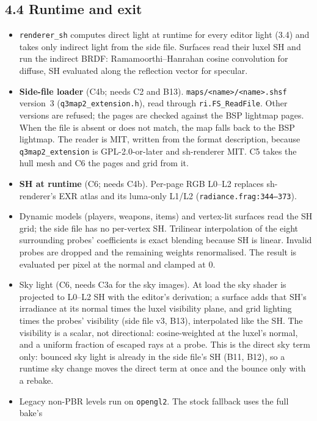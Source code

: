 \documentclass[11pt,a4paper]{article}
\begin{document}
\subsection{4.4 Runtime and exit}
\begin{itemize}
\item \texttt{renderer\_sh} computes direct light at runtime for every editor light (3.4) and takes
  only indirect light from the side file. Surfaces read their luxel SH and run the indirect BRDF:
  Ramamoorthi--Hanrahan cosine convolution for diffuse, SH evaluated along the reflection vector for
  specular.
\item \textbf{Side-file loader} (C4b; needs C2 and B13). \texttt{maps/<name>/<name>.shsf} version~3
  (\texttt{q3map2\_extension.h}), read through \texttt{ri.FS\_ReadFile}. Other versions are
  refused; the pages are checked against the BSP lightmap pages. When the file is absent or does not
  match, the map falls back to the BSP lightmap. The reader is MIT, written from the format
  description, because \texttt{q3map2\_extension} is GPL-2.0-or-later and sh-renderer MIT. C5 takes
  the hull mesh and C6 the pages and grid from it.
\item \textbf{SH at runtime} (C6; needs C4b). Per-page RGB L0--L2 replaces sh-renderer's EXR atlas
  and its luma-only L1/L2 (\texttt{radiance.frag:344--373}).
\item Dynamic models (players, weapons, items) and vertex-lit surfaces read the SH grid; the side
  file has no per-vertex SH. Trilinear interpolation of the eight surrounding probes' coefficients
  is exact blending because SH is linear. Invalid probes are dropped and the remaining weights
  renormalised. The result is evaluated per pixel at the normal and clamped at 0.
\item Sky light (C6, needs C3a for the sky images). At load the sky shader is projected to L0--L2
  SH with the editor's derivation; a surface adds that SH's irradiance at its normal times the
  luxel visibility plane, and grid lighting times the probes' visibility (side file v3, B13),
  interpolated like the SH. The visibility is a scalar, not directional: cosine-weighted at the
  luxel's normal, and a uniform fraction of escaped rays at a probe. This is the direct sky term
  only: bounced sky light is already in the side file's SH (B11, B12), so a runtime sky change
  moves the direct term at once and the bounce only with a rebake.
\item Legacy non-PBR levels run on \texttt{opengl2}. The stock fallback uses the full bake's

\end{itemize}
\end{document}

